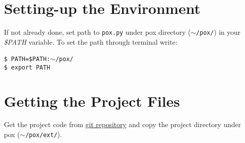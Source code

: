 \documentclass[11pt,a4paper]{report}
\begin{document}
	\section{Setting-up the Environment}
	If not already done, set path to \texttt{pox.py} under pox directory (\texttt{$\sim$/pox/}) in your \textit{\$PATH} variable. To set the path through terminal write:
		\texttt{\\~\\
		\$ PATH=\$PATH:$\sim$/pox/\\
		\$ export PATH}
	\section{Getting the Project Files}
	Get the project code from \textcolor{blue}{\href{Source to GIT}{git repository}} and copy the project directory under pox (\texttt{$\sim$/pox/ext/}).
		
\end{document}
